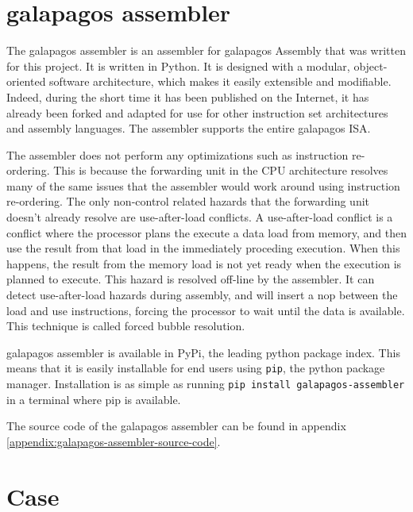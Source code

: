 \section{\Gls{galapagos assembler}}

The \Gls{galapagos assembler} is an assembler for \Gls{galapagos} Assembly that was written for this project.
It is written in Python. 
It is designed with a modular, object-oriented software architecture, which makes it easily extensible and modifiable.
Indeed, during the short time it has been published on the Internet, it has already been forked and adapted for use for other instruction set architectures and assembly languages.\cn {}
The assembler supports the entire \Gls{galapagos} ISA.

The assembler does not perform any optimizations such as instruction re-ordering.
This is because the forwarding unit in the CPU architecture resolves many of the same issues that the assembler would work around using instruction re-ordering.
The only non-control related hazards that the forwarding unit doesn't already resolve  are use-after-load conflicts.
A use-after-load conflict is a conflict where the processor plans the execute a data load from memory, and then use the result from that load in the immediately proceding execution.
When this happens, the result from the memory load is not yet ready when the execution is planned to execute.
This hazard is resolved off-line by the assembler.
It can detect use-after-load hazards during assembly, and will insert a \gls{nop} between the load and use instructions, forcing the processor to wait until the data is available.
This technique is called forced bubble resolution.\cn


\Gls{galapagos assembler} is available in PyPi, the leading python package index.
This means that it is easily installable for end users using \texttt{pip}, the python package manager.
Installation is as simple as running \texttt{pip install galapagos-assembler} in a terminal where pip is available.

The source code of the \Gls{galapagos assembler} can be found in appendix \vref{appendix:galapagos-assembler-source-code}.

\section{Case}


